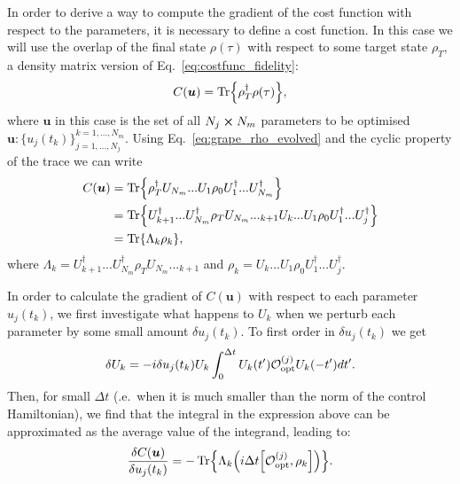 \documentclass[a4paper,oneside,11pt]{book}
\newcommand{\ubb}{\boldsymbol{u}}
\newcommand{\adj}[1]{#1^{\dagger}}
\begin{document}
In order to derive a way to compute the gradient of the cost function with respect to the parameters, it is necessary to define a cost function. In this case we will use the overlap of the final state $\rho(\tau)$ with respect to some target state $\rho_T$, a density matrix version of Eq.~\ref{eq:costfunc_fidelity}:
\begin{equation}
    C(\ubb) = \Tr{\rho_T^{\dagger}\rho(\tau)},
\end{equation}
where $\ubb$ in this case is the set of all $N_j \cross N_m$ parameters to be optimised $\ubb: \{ u_j(t_k)\}_{j = 1, ..., N_j}^{k = 1,...,N_m}$. Using Eq.~\ref{eq:grape_rho_evolved} and the cyclic property of the trace we can write
\begin{equation}\label{eq:grape_costfunc_rewrite}
    \begin{aligned}
        C(\ubb ) &= \Tr{\rho_T^{\dagger}U_{N_m} ... U_{1} \rho_0 \adj{U}_{1} ... \adj{U}_{N_m}} \\
        &=  \Tr{\adj{U}_{k+1} ... \adj{U}_{N_m} \rho_T U_{N_m} ... _{k+1} U_{k} ... U_{1} \rho_0 \adj{U}_{1} ... \adj{U}_{j}} \\
        &= \Tr{\Lambda_k \rho_k},
    \end{aligned}
\end{equation}
where $\Lambda_k = \adj{U}_{k+1} ... \adj{U}_{N_m} \rho_T U_{N_m} ... _{k+1}$ and $\rho_k = U_{k} ... U_{1} \rho_0 \adj{U}_{1} ... \adj{U}_{j}$. 

In order to calculate the gradient of $C(\ubb)$ with respect to each parameter $u_j(t_k)$, we first investigate what happens to $U_k$ when we perturb each parameter by some small amount $\delta u_j(t_k)$. To first order in $\delta u_j(t_k)$ we get
\begin{equation}
    \delta U_k = -i \delta u_j(t_k) U_k \int_0^{\Delta t} U_k(t') \mathcal{O}_{\rm opt}^{(j)} U_k(-t') dt'.
\end{equation}
Then, for small $\Delta t$ (\@i.e.~when it is much smaller than the norm of the control Hamiltonian), we find that the integral in the expression above can be approximated as the average value of the integrand, leading to:
\begin{equation}\label{eq:grape_costfunc_gradient}
    \frac{\delta C(\ubb)}{\delta u_j(t_k)} = - \Tr{\Lambda_k \Big(i\Delta t \comm{\mathcal{O}_{\rm opt}^{(j)}}{\rho_k}\Big)}.
\end{equation}
\end{document}
